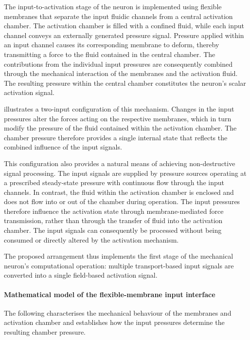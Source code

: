 \documentclass[11pt,a4paper]{article}
\numberwithin{equation}{section}
\begin{document}
The input-to-activation stage of the neuron is implemented using flexible membranes that separate the input fluidic
channels from a central activation chamber. The activation chamber is filled with a confined fluid, while each
input channel conveys an externally generated pressure signal. Pressure applied within an input channel causes its
corresponding membrane to deform, thereby transmitting a force to the fluid contained in the central chamber. The
contributions from the individual input pressures are consequently combined through the mechanical interaction of
the membranes and the activation fluid. The resulting pressure within the central chamber constitutes the neuron's
scalar activation signal.

 illustrates a two-input configuration of this mechanism. Changes in the input pressures
alter the forces acting on the respective membranes, which in turn modify the pressure of the fluid contained within
the activation chamber. The chamber pressure therefore provides a single internal state that reflects the combined
influence of the input signals.

This configuration also provides a natural means of achieving non-destructive signal processing. The input signals
are supplied by pressure sources operating at a prescribed steady-state pressure with continuous flow through the
input channels. In contrast, the fluid within the activation chamber is enclosed and does not flow into or out of
the chamber during operation. The input pressures therefore influence the activation state through
membrane-mediated force transmission, rather than through the transfer of fluid into the activation chamber. The
input signals can consequently be processed without being consumed or directly altered by the activation
mechanism.

The proposed arrangement thus implements the first stage of the mechanical neuron's computational operation:
multiple transport-based input signals are converted into a single field-based activation signal.

\paragraph{Mathematical model of the flexible-membrane input interface}

The following characterises the mechanical behaviour of the membranes and activation chamber and establishes how
the input pressures determine the resulting chamber pressure.
\end{document}
